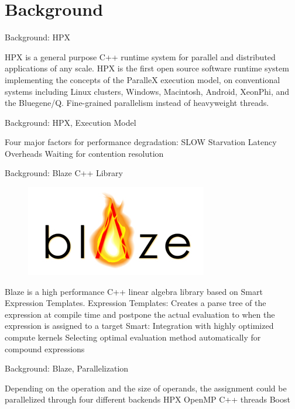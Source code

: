 \documentclass[10pt]{beamer}
\begin{document}
\section{Background}
\begin{frame}{Background: HPX}
	\begin{outline}
		\1HPX is a general purpose C++ runtime system for parallel and distributed applications of any scale.
		\1HPX is the first
		open source software runtime system implementing the concepts of
		the ParalleX execution model, on conventional systems
		including Linux clusters, Windows, Macintosh, Android, XeonPhi,
		and the Bluegene/Q.
		\1Fine-grained parallelism instead of heavyweight threads.
	\end{outline}
\end{frame}

\begin{frame}{Background: HPX, Execution Model}
	\begin{outline}
		Four major factors for performance degradation: SLOW
		\1Starvation
		\1Latency
		\1Overheads
		\1Waiting for contention resolution
	\end{outline}
\end{frame}


\begin{frame}{Background: Blaze C++ Library}
\begin{outline}
\begin{figure}[H]

	\includegraphics[width=0.22\linewidth]{images/blaze.png}
\end{figure}	
Blaze is a high performance C++ linear algebra library based on Smart Expression Templates.
 \1Expression Templates:
	\2Creates a parse tree of the expression at compile time and postpone the actual evaluation to when the expression is assigned to a target
\1 Smart: 
	\2Integration with highly optimized compute kernels
	\2Selecting optimal evaluation method automatically for compound expressions
\end{outline}
\end{frame}


\begin{frame}{Background: Blaze, Parallelization}
	\begin{outline}
		Depending on the operation and the size of operands, the assignment could be parallelized through four different backends
		\1 HPX 
		\1OpenMP
		\1C++ threads
		\1Boost
	\end{outline}
\end{frame}
\end{document}
